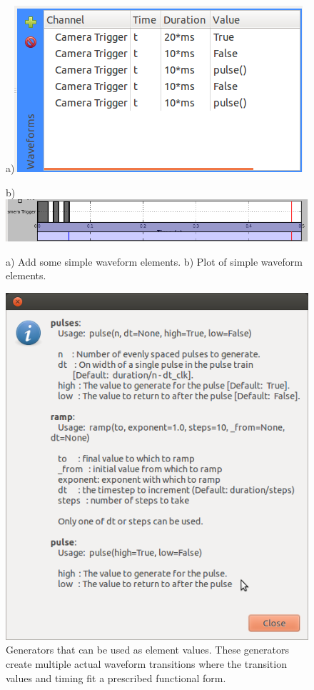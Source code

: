 \begin{enumerate}
\begin{enumerate}
        \begin{figure}[ht]
          \centerline{a)\includegraphics[width=.5\textwidth]{figures/waveform-3}}
          \centerline{b)\includegraphics[width=.8\textwidth]{figures/plot-3}}
          \caption{a) Add some simple waveform elements. b) Plot of simple
          waveform elements.}
          \label{fig:quick:waveform-3}
        \end{figure}

        \begin{figure}[ht]
          \centerline{\includegraphics[width=.8\textwidth]{figures/generators}}
          \caption{Generators that can be used as element values.  These
          generators create multiple actual waveform transitions where the
          transition values and timing fit a prescribed functional form.}
          \label{fig:quick:generators}
        \end{figure}


\end{enumerate}
\end{enumerate}
